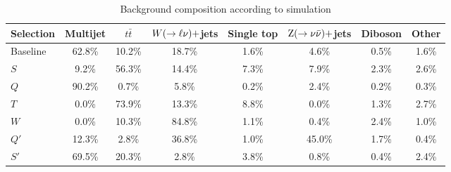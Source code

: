 \begin{table}[htpb]
\centering
\caption{Background composition according to simulation
\label{tab:BG_comp_percent}}
\vspace{1ex}
{\footnotesize
\begin{tabular}{ l  c  c  c  c  c  c  c }
\toprule
Selection & Multijet & $t\bar{t}$ & $W(\rightarrow \ell\nu)+$jets & Single top & $\mathrm{Z}(\rightarrow
\nu\bar{\nu})+$jets & Diboson & Other \\  
\midrule
Baseline & 62.8\% & 10.2\% & 18.7\% & 1.6\% & 4.6\%  & 0.5\% & 1.6\% \\ 
$S$      & 9.2\%  & 56.3\% & 14.4\% & 7.3\% & 7.9\%  & 2.3\% & 2.6\% \\
$Q$      & 90.2\% & 0.7\%  & 5.8\%  & 0.2\% & 2.4\%  & 0.2\% & 0.3\% \\
$T$      & 0.0\%  & 73.9\% & 13.3\% & 8.8\% & 0.0\%  & 1.3\% & 2.7\% \\
$W$      & 0.0\%  & 10.3\% & 84.8\% & 1.1\% & 0.4\%  & 2.4\% & 1.0\% \\
$Q'$     & 12.3\% & 2.8\%  & 36.8\% & 1.0\% & 45.0\% & 1.7\% & 0.4\% \\  
$S'$     & 69.5\% & 20.3\% & 2.8\%  & 3.8\% & 0.8\%  & 0.4\% & 2.4\% \\
\bottomrule
\end{tabular}
}
\end{table}

 

 

